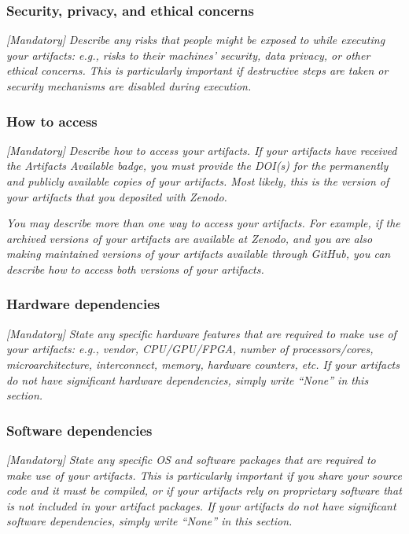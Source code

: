 \documentclass[sigconf]{acmart}
\begin{document}

\subsubsection{Security, privacy, and ethical concerns}

\emph{[Mandatory]}
%
\emph{Describe any risks that people might be exposed to while
executing your artifacts: e.g., risks to their machines' security,
data privacy, or other ethical concerns.  This is particularly
important if destructive steps are taken or security mechanisms are
disabled during execution.}


\subsubsection{How to access}

\emph{[Mandatory]}
%
\emph{Describe how to access your artifacts.  If your artifacts have
received the \emph{Artifacts Available} badge, you must provide the
DOI(s) for the permanently and publicly available copies of your
artifacts.  Most likely, this is the version of your artifacts that
you deposited with Zenodo.}

\emph{You may describe more than one way to access your artifacts.
For example, if the archived versions of your artifacts are available
at Zenodo, and you are also making maintained versions of your
artifacts available through GitHub, you can describe how to access
both versions of your artifacts.}


\subsubsection{Hardware dependencies}

\emph{[Mandatory]}
%
\emph{State any specific hardware features that are required to make
use of your artifacts: e.g., vendor, CPU/GPU/FPGA, number of
processors/cores, microarchitecture, interconnect, memory, hardware
counters, etc.  If your artifacts do not have significant hardware
dependencies, simply write ``None'' in this section.}


\subsubsection{Software dependencies}

\emph{[Mandatory]}
%
\emph{State any specific OS and software packages that are required to
make use of your artifacts.  This is particularly important if you
share your source code and it must be compiled, or if your artifacts
rely on proprietary software that is not included in your artifact
packages.  If your artifacts do not have significant software
dependencies, simply write ``None'' in this section.}
\end{document}
